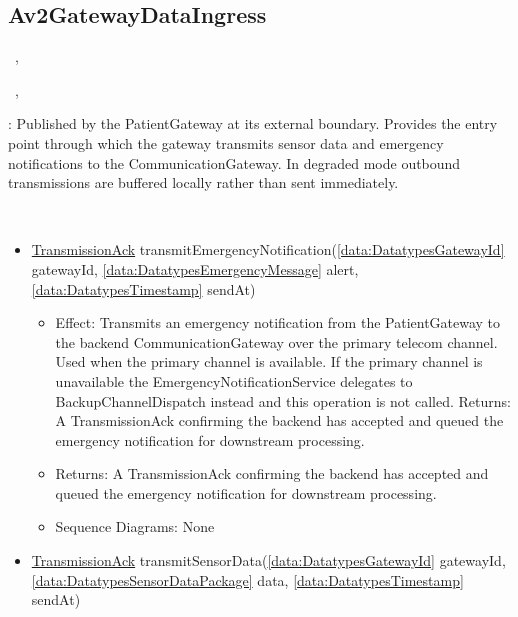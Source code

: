   \subsection{Av2GatewayDataIngress}\label{int:InterfacesAv2GatewayDataIngress}
    \begin{description}
      \item[Provided by:] \iconcomponent{}~, \iconcomponent{}~
      \item[Required by:] \iconcomponent{}~, \iconcomponent{}~ 
           \item[Description]: Published by the PatientGateway at its external boundary. Provides the entry point through which the gateway transmits sensor data and emergency notifications to the CommunicationGateway. In degraded mode outbound transmissions are buffered locally rather than sent immediately.
      \item[Operations:] ~
    \begin{itemize}[noitemsep,nolistsep,leftmargin=-.25cm]
      \item \textsf{{\colorbox{red!30}{\underline{TransmissionAck}}} transmitEmergencyNotification(\ref{data:DatatypesGatewayId} gatewayId, \ref{data:DatatypesEmergencyMessage} alert, \ref{data:DatatypesTimestamp} sendAt)}
        \begin{itemize}[noitemsep,nolistsep]
           \item Effect: Transmits an emergency notification from the PatientGateway to the backend CommunicationGateway over the primary telecom channel. Used when the primary channel is available. If the primary channel is unavailable the EmergencyNotificationService delegates to BackupChannelDispatch instead and this operation is not called.
Returns: A TransmissionAck confirming the backend has accepted and queued the emergency notification for downstream processing. 
           \item Returns: A TransmissionAck confirming the backend has accepted and queued the emergency notification for downstream processing.
           \item Sequence Diagrams: None
        \end{itemize}
      \item \textsf{{\colorbox{red!30}{\underline{TransmissionAck}}} transmitSensorData(\ref{data:DatatypesGatewayId} gatewayId, \ref{data:DatatypesSensorDataPackage} data, \ref{data:DatatypesTimestamp} sendAt)}

\end{itemize}
\end{description}
